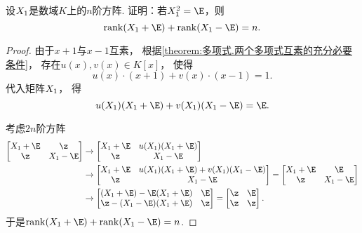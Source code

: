\begin{example}\label{example:矩阵乘积的秩.矩阵的一次多项式的秩之和.取等条件1}
设\(X_1\)是数域\(K\)上的\(n\)阶方阵.
证明：若\(\A^2=\E\)，则\[
	\rank(\A+\E)+\rank(\A-\E)=n.
\]
\begin{proof}
由于\(x+1\)与\(x-1\)互素，
根据\cref{theorem:多项式.两个多项式互素的充分必要条件}，
存在\(u(x),v(x) \in K[x]\)，
使得\[
	u(x) \cdot (x+1) + v(x) \cdot (x-1) = 1.
\]
代入矩阵\(X_1\)，
得\[
	u(\A) (\A+\E) + v(\A) (\A-\E) = \E.
\]

考虑\(2n\)阶方阵
\begin{align*}
	\begin{bmatrix}
		\A+\E & \z \\
		\z & \A-\E
	\end{bmatrix}
	&\to
	\begin{bmatrix}
		\A+\E & u(\A) (\A+\E) \\
		\z & \A-\E
	\end{bmatrix} \\
	&\to
	\begin{bmatrix}
		\A+\E & u(\A) (\A+\E) + v(\A) (\A-\E) \\
		\z & \A-\E
	\end{bmatrix}
	=\begin{bmatrix}
		\A+\E & \E \\
		\z & \A-\E
	\end{bmatrix} \\
	&\to
	\begin{bmatrix}
		(\A+\E)-\E(\A+\E) & \E \\
		\z-(\A-\E)(\A+\E) & \z
	\end{bmatrix}
	=\begin{bmatrix}
		\z & \E \\
		\z & \z
	\end{bmatrix}.
\end{align*}
于是\(\rank(\A+\E)+\rank(\A-\E)=n\).
\end{proof}
\end{example}
